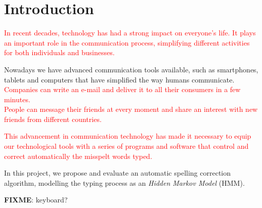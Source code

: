 \chapter{Introduction}
\label{chap:Introduction}

\textcolor{red}{In recent decades, technology has had a strong impact on everyone's life. It plays an important 
role in the communication process, simplifying different activities for both individuals and businesses.}

Nowadays we have advanced communication tools available, such as smartphones, tablets and computers that 
have simplified the way humans communicate. \\
\textcolor{red}{Companies can write an e-mail and deliver it to all their consumers in a few minutes. \\
People can message their friends at every moment and share an interest with new friends from different 
countries.}

\textcolor{red}{This advancement in communication technology has made it necessary to equip our technological tools with 
a series of programs and software that control and correct automatically the misspelt words typed.}

In this project, we propose and evaluate an automatic spelling correction algorithm, modelling the typing 
process as an \textit{Hidden Markov Model} (HMM). 


\textbf{FIXME}:  keyboard? 

